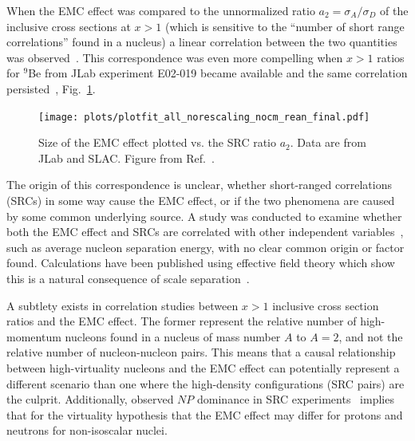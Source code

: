 When the EMC effect was compared to the unnormalized ratio $a_2=\sigma_A/\sigma_D$ of the
inclusive cross sections at $x>1$ (which is sensitive to the ``number of short range correlations''
found in a nucleus) a linear correlation between the two quantities was observed~\cite{Weinstein:2010rt}.
This correspondence was even more compelling when $x>1$ ratios for $^9$Be from JLab experiment E02-019 became
available and the same correlation persisted~\cite{Arrington:2012ax, Hen:2012fm}, Fig.~\ref{fig:emc_src_bff}.

\begin{figure}[tbp]
  \centering\texttt{[image: plots/plotfit\_all\_norescaling\_nocm\_rean\_final.pdf]}
  \caption{Size of the EMC effect plotted vs. the SRC ratio $a_2$. Data are from JLab and SLAC. Figure
  from Ref.~\cite{Arrington:2012ax}.}
  \label{fig:emc_src_bff}
\end{figure}

The origin of this correspondence is unclear, whether short-ranged correlations (SRCs) in some way cause the EMC effect, or if the two
phenomena are caused by some common underlying source.  A study was conducted to examine whether
both the EMC effect and SRCs are correlated with other independent variables~\cite{Arrington:2012ax}, such
as average nucleon separation energy, with no clear common origin or factor found.  Calculations have been 
published using effective field theory which show this is a natural consequence of scale separation~\cite{PhysRevLett.119.262502}.

A subtlety exists in correlation studies between $x>1$ inclusive cross section ratios and the EMC effect.  The former represent the relative number of high-momentum nucleons found in a nucleus of mass number $A$ to $A=2$, and not the relative number of nucleon-nucleon pairs.  This means that a causal relationship between high-virtuality nucleons and the EMC effect can potentially represent a different scenario than one where the high-density configurations (SRC pairs) are the culprit.  Additionally, observed $NP$ dominance in SRC experiments~\cite{Subedi:2008zz} implies that for the virtuality hypothesis that the EMC effect may differ for protons and neutrons for non-isoscalar nuclei.%

